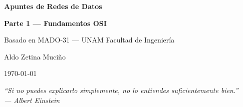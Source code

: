 \documentclass[12pt, a4paper, openany]{book}
\begin{document}
\pagecolor{darkbg}
\color{textlight}
\makeatletter
{}
\def\normalcolor{\color{normalcolor@tmp}}
\makeatother

\renewcommand{\chaptermark}[1]{\markboth{\chaptername\ \thechapter.\ #1}{}}
\renewcommand{\sectionmark}[1]{\markright{\thesection.\ #1}}

\begin{titlepage}
    \centering
    \vspace*{2cm}
    {\Huge\bfseries {} Apuntes de Redes de Datos\par}
    \vspace{0.5cm}
    {\Large\bfseries Parte 1 --- Fundamentos OSI\par}
    \vspace{1cm}
    {\large Basado en MADO-31 --- UNAM Facultad de Ingeniería\par}
    \vspace{0.5cm}
    {\large Aldo Zetina Muciño\par}
    \vspace{0.5cm}
    {\normalsize \today\par}
    \vspace{2cm}
    {\large\itshape ``Si no puedes explicarlo simplemente, no lo entiendes suficientemente bien.''\\[4pt]
    --- Albert Einstein\par}
\end{titlepage}

\tableofcontents
\newpage











\end{document}
